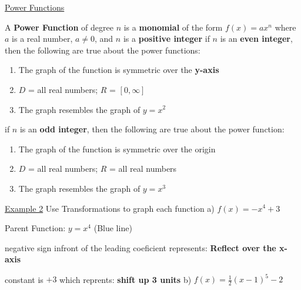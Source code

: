 \documentclass{report}
\begin{document}
  \bigbreak \bigbreak \noindent
  \begin{Large}

  \noindent  \underline{Power Functions}

  \end{Large}
  \bigbreak \noindent
  A \textbf{Power Function} of degree $n$ is a \textbf{monomial} of the form $f(x) = ax^n$
  where $a$ is a real number, $a \neq{0}$, and $n$ is a \textbf{positive integer}
  \bigbreak \noindent
  if $n$ is an \textbf{even integer}, then the following are true about the power functions:
  \begin{enumerate}
  \item The graph of the function is symmetric over the \textbf{y-axis}
  \item $D$ = all real numbers; $R$ = $[0,\infty]$
  \item The graph resembles the graph of $y = x^2$
  \end{enumerate}
  if $n$ is an \textbf{odd integer}, then the following are true about the power function:
  \begin{enumerate}
    \item The graph of the function is symmetric over the origin
    \item $D$ = all real numbers; $R$ = all real numbers
    \item The graph resembles the graph of $y = x^3$
  \end{enumerate}
  \bigbreak \bigbreak

  \noindent \underline{Example 2}{
  Use Transformations to graph each function
}
  \bigbreak
  \noindent a) $f(x) = -x^4 + 3$


  Parent Function: $y = x^4$ (Blue line)

  negative sign infront of the leading coeficient represents: \textbf{Reflect over the x-axis}

  constant is $+3$ which reprents: \textbf{shift up 3 units}
  \bigbreak \bigbreak \noindent
  b) $f(x) = \frac{1}{2}(x-1)^5 - 2$
\end{document}

